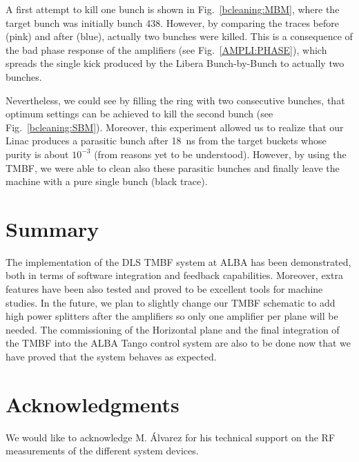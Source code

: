 \documentclass[a4paper,
              ]{jacow}
\begin{document}
A first attempt to kill one bunch is shown in Fig.~\ref{bcleaning:MBM}, where the target bunch was initially bunch 438. However, by comparing the traces before (pink) and after (blue), actually two bunches were killed. This is a consequence of the bad phase response of the amplifiers (see Fig.~\ref{AMPLI:PHASE}), which spreads the single kick produced by the Libera Bunch-by-Bunch to actually two bunches.  



Nevertheless, we could see by filling the ring with two consecutive bunches, that optimum settings can be achieved to kill the second bunch (see Fig.~\ref{bcleaning:SBM}). Moreover, this experiment allowed us to realize that our Linac produces a parasitic bunch after 18~ns from the target buckets whose purity is about $10^{-3}$ (from reasons yet to be understood). However, by using the TMBF, we were able to clean also these parasitic bunches and finally leave the machine with a pure single bunch (black trace). 


\section{Summary}
\balance
The implementation of the DLS TMBF system at ALBA has been demonstrated, both in terms of software integration and feedback capabilities. Moreover, extra features have been also tested and proved to be excellent tools for machine studies. In the future, we plan to slightly change our TMBF schematic to add high power splitters after the amplifiers so only one amplifier per plane will be needed. The commissioning of the Horizontal plane and the final integration of the TMBF into the ALBA Tango control system are also to be done now that we have proved that the system behaves as expected.

\section{Acknowledgments}

We would like to acknowledge M. Álvarez for his technical support on the RF measurements of the different system devices.


\iffalse  %
	\newpage
	\printbibliography

\else
\end{document}
